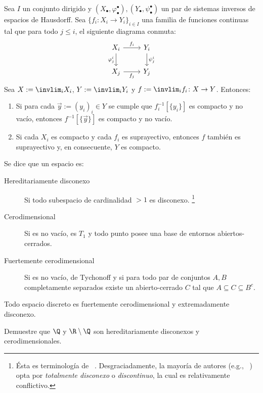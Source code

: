 \documentclass[topologia-analisis.tex]{subfiles}
\begin{document}
\begin{cor}\label{thm:proj_lim_surj_maps}
	Sea $I$ un conjunto dirigido y $(X_\bullet, \varphi_\bullet^\bullet), (Y_\bullet, \psi_\bullet^\bullet)$ un par de sistemas inversos
	de espacios de Hausdorff.
	Sea $\{ f_i \colon X_i \to Y_i \}_{i\in I}$ una familia de funciones continuas tal que para todo $j \le i$, el siguiente diagrama conmuta:
	\[\begin{tikzcd}
		{X_i} & {Y_i} \\
		{X_j} & {Y_j}
		\arrow["{\psi^i_j}", from=1-2, to=2-2]
		\arrow["{\varphi^i_j}"', from=1-1, to=2-1]
		\arrow["{f_i}", from=1-1, to=1-2]
		\arrow["{f_j}"', from=2-1, to=2-2]
	\end{tikzcd}\]
	Sea $X := \invlim_i X_i$, $Y := \invlim_i Y_i$ y $f := \invlim_i f_i \colon X \to Y$. Entonces:
	\begin{enumerate}
		\item Si para cada $\vec y := (y_i)_i \in Y$ se cumple que $f_i^{-1}[\{ y_i \}]$ es compacto y no vacío,
			entonces $f^{-1}[\{ \vec y \}]$ es compacto y no vacío.
		\item Si cada $X_i$ es compacto y cada $f_i$ es suprayectivo, entonces $f$ también es suprayectivo y, en consecuente, $Y$ es compacto.
	\end{enumerate}
\end{cor}
\thmdep{}

\begin{mydef}
	Se dice que un espacio es:
	\begin{description}
		\item[Hereditariamente disconexo]
			Si todo subespacio de cardinalidad ${}>1$ es disconexo.%
			\footnote{Ésta es terminología de \citeauthor{engelking:top}~\cite{engelking:top}.
			Desgraciadamente, la mayoría de autores (e.g., \citeauthor{bourbaki:TG1}~\cite[I.83]{bourbaki:TG1}) opta por \textit{totalmente
			disconexo} o \textit{discontinuo}, la cual es relativamente conflictivo.}
		\item[Cerodimensional]
			Si es no vacío, es $T_1$ y todo punto posee una base de entornos abiertos-cerrados.
		\item[Fuertemente cerodimensional]
			Si es no vacío, de Tychonoff y si para todo par de conjuntos $A,B$
			completamente separados existe un abierto-cerrado $C$ tal que $A\subseteq C \subseteq B^c$.
	\end{description}
\end{mydef}
Todo espacio discreto es fuertemente cerodimensional y extremadamente disconexo.
\begin{prob}
	Demuestre que $\Q$ y $\R \setminus \Q$ son hereditariamente disconexos y cerodimensionales.
\end{prob}
\end{document}

